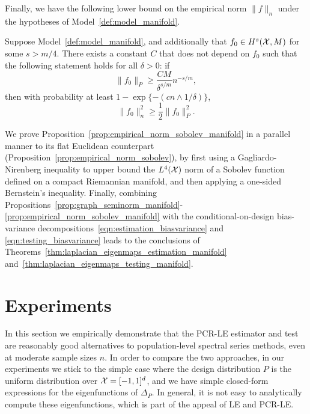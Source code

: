 Finally, we have the following lower bound on the empirical norm $\|f\|_n$ under the hypotheses of Model~\ref{def:model_manifold}. 
\begin{proposition}
	\label{prop:empirical_norm_sobolev_manifold}
	Suppose Model~\ref{def:model_manifold}, and additionally that $f_0 \in H^s(\mathcal{X},M)$ for some $s > m/4$. There exists a constant $C$ that does not depend on $f_0$ such that the following statement holds for all $\delta > 0$:  if
	\begin{equation}
	\label{eqn:empirical_norm_sobolev_manifold_1}
	\|f_0\|_{P} \geq \frac{C M}{\delta^{s/m}}n^{-s/m},
	\end{equation}
	then with probability at least $1 - \exp\{-(cn \wedge 1/\delta)\}$,
	\begin{equation}
	\label{eqn:empirical_norm_sobolev_manifold}
	\|f_0\|_n^2 \geq \frac{1}{2} \|f_0\|_P^2.
	\end{equation}
\end{proposition}
We prove Proposition~\ref{prop:empirical_norm_sobolev_manifold} in a parallel manner to its flat Euclidean counterpart (Proposition~\ref{prop:empirical_norm_sobolev}), by first using a Gagliardo-Nirenberg inequality to upper bound the $L^4(\mathcal{X})$ norm of a Sobolev function defined on a compact Riemannian manifold, and then applying a one-sided Bernstein's inequality. Finally, combining Propositions~\ref{prop:graph_seminorm_manifold}-\ref{prop:empirical_norm_sobolev_manifold} with the conditional-on-design bias-variance decompositions~\eqref{eqn:estimation_biasvariance} and \eqref{eqn:testing_biasvariance} leads to the conclusions of Theorems~\ref{thm:laplacian_eigenmaps_estimation_manifold} and~\ref{thm:laplacian_eigenmaps_testing_manifold}. 

\section{Experiments}
\label{sec:experiments}

In this section we empirically demonstrate that the PCR-LE estimator and test are reasonably good alternatives to population-level spectral series methods, even at moderate sample sizes $n$. In order to compare the two approaches, in our experiments we stick to the simple case where the design distribution $P$ is the uniform distribution over $\mathcal{X} = [-1,1]^d$, and we have simple closed-form expressions for the eigenfunctions of $\Delta_P$. In general, it is not easy to analytically compute these eigenfunctions, which is part of the appeal of LE and PCR-LE.

